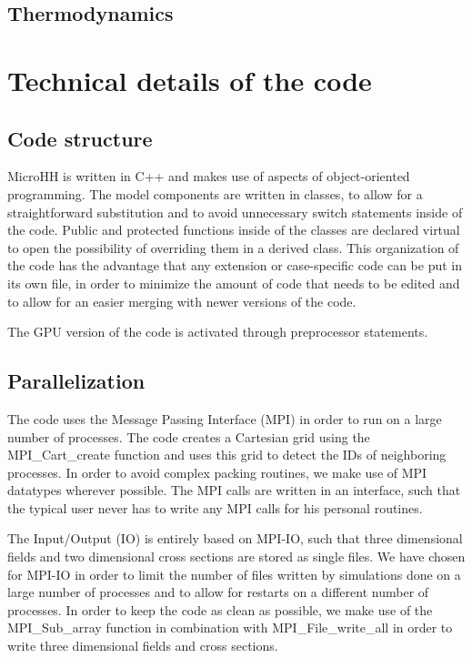 \documentclass[gmd]{copernicus}
\begin{document}
\subsection{Thermodynamics}

\section{Technical details of the code}\label{sec:technical}
\subsection{Code structure}
MicroHH is written in C++ and makes use of aspects of object-oriented programming. The model components are written in classes, to allow for a straightforward substitution and to avoid unnecessary switch statements inside of the code. Public and protected functions inside of the classes are declared virtual to open the possibility of overriding them in a derived class. This organization of the code has the advantage that any extension or case-specific code can be put in its own file, in order to minimize the amount of code that needs to be edited and to allow for an easier merging with newer versions of the code.

The GPU version of the code is activated through preprocessor statements. 

\subsection{Parallelization}
The code uses the Message Passing Interface (MPI) in order to run on a large number of processes. The code creates a Cartesian grid using the MPI\_Cart\_create function and uses this grid to detect the IDs of neighboring processes. In order to avoid complex packing routines, we make use of MPI datatypes wherever possible. The MPI calls are written in an interface, such that the typical user never has to write any MPI calls for his personal routines.

The Input/Output (IO) is entirely based on MPI-IO, such that three dimensional fields and two dimensional cross sections are stored as single files. We have chosen for MPI-IO in order to limit the number of files written by simulations done on a large number of processes and to allow for restarts on a different number of processes. In order to keep the code as clean as possible, we make use of the MPI\_Sub\_array function in combination with MPI\_File\_write\_all in order to write three dimensional fields and cross sections.
\end{document}

